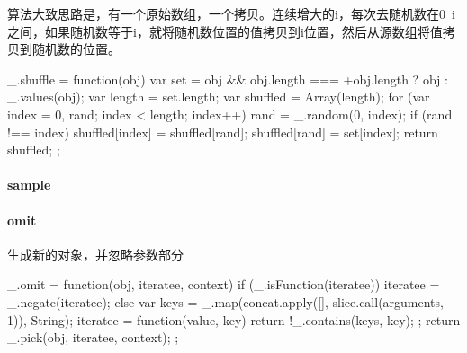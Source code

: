 算法大致思路是，有一个原始数组，一个拷贝。连续增大的i，每次去随机数在0~i之间，如果随机数等于i，就将随机数位置的值拷贝到i位置，然后从源数组将值拷贝到随机数的位置。

\begin{JavaScript}
  _.shuffle = function(obj) {
    var set = obj && obj.length === +obj.length ? obj : _.values(obj);
    var length = set.length;
    var shuffled = Array(length);
    for (var index = 0, rand; index < length; index++) {
      rand = _.random(0, index);
      if (rand !== index) shuffled[index] = shuffled[rand];
      shuffled[rand] = set[index];
    }
    return shuffled;
  };
\end{JavaScript}


\paragraph{sample}


\paragraph{omit} 生成新的对象，并忽略参数部分
\begin{JavaScript}
  _.omit = function(obj, iteratee, context) {
    if (_.isFunction(iteratee)) {
      iteratee = _.negate(iteratee);
    } else {
      var keys = _.map(concat.apply([], slice.call(arguments, 1)), String);
      iteratee = function(value, key) {
        return !_.contains(keys, key);
      };
    }
    return _.pick(obj, iteratee, context);
  };
\end{JavaScript}

